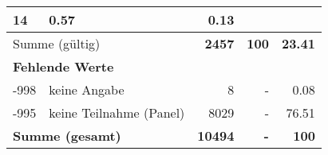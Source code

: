 \begin{longtable}{lXrrr}
       \num{14} &
       \num[round-mode=places,round-precision=2]{0,57} &
         \num[round-mode=places,round-precision=2]{0,13} \\
     \midrule
     \multicolumn{2}{l}{Summe (gültig)} &
       \textbf{\num{2457}} &
     \textbf{100} &
       \textbf{\num[round-mode=places,round-precision=2]{23,41}} \\
     \multicolumn{5}{l}{\textbf{Fehlende Werte}}\\
       -998 &
       keine Angabe &
         \num{8} &
        - &
         \num[round-mode=places,round-precision=2]{0,08} \\
       -995 &
       keine Teilnahme (Panel) &
         \num{8029} &
        - &
         \num[round-mode=places,round-precision=2]{76,51} \\
     \midrule
     \multicolumn{2}{l}{\textbf{Summe (gesamt)}} &
          \textbf{\num{10494}} &
        \textbf{-} &
        \textbf{100} \\
     \bottomrule
     \end{longtable}
     
